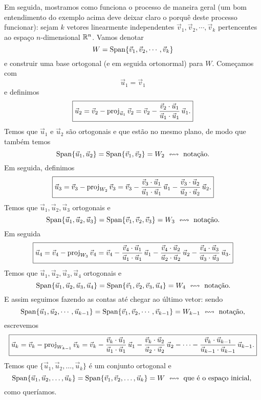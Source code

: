 \documentclass[../livro.tex]{subfiles}  %
\begin{document}
Em seguida, mostramos como funciona o processo de maneira geral (um bom entendimento do exemplo acima deve deixar claro o porquê deste processo funcionar): sejam $k$ vetores linearmente independentes $\vec{v}_1, \vec{v}_2, \cdots, \vec{v}_k$ pertencentes ao espaço $n$-dimensional $\mathbb{R}^n$. Vamos denotar
\[
W = \operatorname{Span} \{\vec{v}_1, \vec{v}_2, \cdots, \vec{v}_k\}
\] e construir uma base ortogonal (e em seguida ortonormal) para $W$. Começamos com
\[
\boxed{\vec{u}_1 = \vec{v}_1}
\] e definimos
\[
\boxed{\vec{u}_2 = \vec{v}_2 - \operatorname{proj}_{\vec{u}_1} \vec{v}_2 = \vec{v}_2 - \frac{\vec{v}_2 \cdot \vec{u}_1}{\vec{u}_1 \cdot \vec{u}_1} \, \vec{u}_1.}
\] Temos que $\vec{u}_1$ e $\vec{u}_2$ são ortogonais e que estão no mesmo plano, de modo que também temos
\[
\operatorname{Span} \{ \vec{u}_1, \vec{u}_2 \} = \operatorname{Span} \{ \vec{v}_1, \vec{v}_2 \} = W_2 \ \leftrightsquigarrow \text{ notação.}
\] Em seguida, definimos
\[
\boxed{\vec{u}_3 = \vec{v}_3 - \operatorname{proj}_{W_2} \vec{v}_3 = \vec{v}_3 - \frac{\vec{v}_3 \cdot \vec{u}_1}{\vec{u}_1 \cdot \vec{u}_1} \, \vec{u}_1 - \frac{\vec{v}_3 \cdot \vec{u}_2}{\vec{u}_2 \cdot \vec{u}_2} \, \vec{u}_2.}
\] Temos que $\vec{u}_1, \vec{u}_2, \vec{u}_3$ ortogonais e
\[
\Span \{ \vec{u}_1, \vec{u}_2, \vec{u}_3 \} = \Span \{ \vec{v}_1, \vec{v}_2, \vec{v}_3 \} = W_3 \ \leftrightsquigarrow \text{ notação.}
\] Em seguida
\[
\boxed{\vec{u}_4 = \vec{v}_4 - \operatorname{proj}_{W_3} \vec{v}_4 = \vec{v}_4 - \frac{\vec{v}_4 \cdot \vec{u}_1}{\vec{u}_1 \cdot \vec{u}_1} \, \vec{u}_1 - \frac{\vec{v}_4 \cdot \vec{u}_2}{\vec{u}_2 \cdot \vec{u}_2} \, \vec{u}_2 - \frac{\vec{v}_4 \cdot \vec{u}_3}{\vec{u}_3 \cdot \vec{u}_3} \, \vec{u}_3.}
\] Temos que $\vec{u}_1, \vec{u}_2, \vec{u}_3, \vec{u}_4$ ortogonais e
\[
\operatorname{Span} \{ \vec{u}_1, \vec{u}_2, \vec{u}_3, \vec{u}_4 \} = \operatorname{Span} \{ \vec{v}_1, \vec{v}_2, \vec{v}_3, \vec{u}_4 \} = W_4 \ \leftrightsquigarrow \text{ notação.}
\] E assim seguimos fazendo as contas até chegar ao último vetor: sendo
\[
\operatorname{Span} \{ \vec{u}_1, \vec{u}_2, \cdots, \vec{u}_{k-1} \} = \operatorname{Span} \{ \vec{v}_1, \vec{v}_2, \cdots, \vec{v}_{k-1} \} = W_{k-1} \ \leftrightsquigarrow \text{ notação,}
\] escrevemos
\[
\boxed{\vec{u}_k = \vec{v}_k - \operatorname{proj}_{W_{k-1}} \vec{v}_k = \vec{v}_k - \frac{\vec{v}_k \cdot \vec{u}_1}{\vec{u}_1 \cdot \vec{u}_1} \, \vec{u}_1 - \frac{\vec{v}_k \cdot \vec{u}_2}{\vec{u}_2 \cdot \vec{u}_2} \, \vec{u}_2 - \cdots - \frac{\vec{v}_k \cdot \vec{u}_{k-1}}{\vec{u}_{k-1} \cdot \vec{u}_{k-1}} \, \vec{u}_{k-1}.}
\] Temos que $\{\vec{u}_1, \vec{u}_2, \dots, \vec{u}_k\}$ é um conjunto ortogonal e
\[
\operatorname{Span} \{ \vec{u}_1, \vec{u}_2, \dots, \vec{u}_k \} = \operatorname{Span} \{ \vec{v}_1, \vec{v}_2, \dots, \vec{u}_k \} = W \ \leftrightsquigarrow \text{ que é o espaço inicial, }
\] como queríamos.
\end{document}
